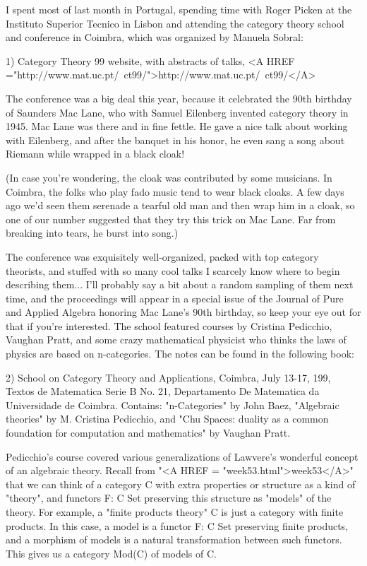 

I spent most of last month in Portugal, spending time with Roger Picken
at the Instituto Superior Tecnico in Lisbon and attending the category
theory school and conference in Coimbra, which was organized by Manuela
Sobral:

1) Category Theory 99 website, with abstracts of talks, 
<A HREF ="http://www.mat.uc.pt/~ct99/">http://www.mat.uc.pt/~ct99/</A>

The conference was a big deal this year, because it celebrated the
90th birthday of Saunders Mac Lane, who with Samuel Eilenberg invented
category theory in 1945.  Mac Lane was there and in fine fettle.  He
gave a nice talk about working with Eilenberg, and after the banquet
in his honor, he even sang a song about Riemann while wrapped in a
black cloak!

(In case you're wondering, the cloak was contributed by some musicians.
In Coimbra, the folks who play fado music tend to wear black cloaks. 
A few days ago we'd seen them serenade a tearful old man and then wrap 
him in a cloak, so one of our number suggested that they try this trick on 
Mac Lane.  Far from breaking into tears, he burst into song.)

The conference was exquisitely well-organized, packed with top 
category theorists, and stuffed with so many cool talks I scarcely 
know where to begin describing them... I'll probably say a bit 
about a random sampling of them next time, and the proceedings 
will appear in a special issue of the Journal of Pure and Applied
Algebra honoring Mac Lane's 90th birthday, so keep your eye out for 
that if you're interested.  The school featured courses by Cristina 
Pedicchio, Vaughan Pratt, and some crazy mathematical physicist who 
thinks the laws of physics are based on n-categories.  The notes can 
be found in the following book: 

2) School on Category Theory and Applications, Coimbra, July
13-17, 199, Textos de Matematica Serie B No. 21, Departamento De 
Matematica da Universidade de Coimbra.  Contains: "n-Categories" 
by John Baez, "Algebraic theories" by M. Cristina Pedicchio, and 
"Chu Spaces: duality as a common foundation for computation and 
mathematics" by Vaughan Pratt.  

Pedicchio's course covered various generalizations of Lawvere's
wonderful concept of an algebraic theory.  Recall from "<A HREF = "week53.html">week53</A>" 
that we can think of a category C with extra properties or structure 
as a kind of "theory", and functors F: C \to  Set preserving this 
structure as "models" of the theory.  For example, a "finite
products theory" C is just a category with finite products.  In
this case, a model is a functor F: C \to  Set preserving finite 
products, and a morphism of models is a natural transformation 
between such functors.  This gives us a category Mod(C) of models 
of C.

